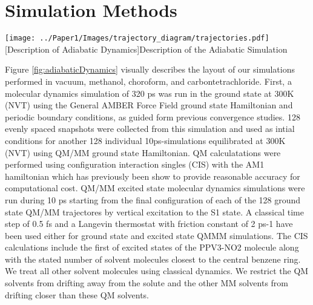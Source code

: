 \section{Simulation Methods}

\noindent
\begin{minipage}[c]{\textwidth}
  \centering
  \texttt{[image: ../Paper1/Images/trajectory\_diagram/trajectories.pdf]}
  [Description of Adiabatic Dynamics]{Description of the Adiabatic Simulation}
  \label{fig:adiabaticDynamics}
\end{minipage}\bigskip

Figure \ref{fig:adiabaticDynamics} visually describes the layout of our simulations performed in vacuum, methanol, choroform, and carbontetrachloride.
First, a molecular dynamics simulation of 320 ps was run in the ground state at 300K (NVT) using the General AMBER Force Field ground state Hamiltonian and periodic boundary conditions, as guided form previous convergence studies. \cite{silva2010benchmark}
128 evenly spaced snapshots were collected from this simulation and used as intial conditions for another 128 individual 10ps-simulations equilibrated at 300K (NVT) using QM/MM ground state Hamiltonian.
QM calculatations were performed using configuration interaction singles (CIS) with the AM1 hamiltonian which has previously been show to provide reasonable accuracy for computational cost. \cite{silva2010benchmark}
QM/MM excited state molecular dynamics simulations were run during 10 ps starting from the final configuration of each of the 128 ground state QM/MM trajectores by vertical excitation to the S1 state. \cite{nelson2012nonadiabatic}
A classical time step of 0.5 fs and a Langevin thermostat with friction constant of 2 ps-1 have been used either for ground state and excited state QMMM simulations. \cite{nelson2012nonadiabatic}
The CIS calculations include the first of excited states of the PPV3-NO2 molecule along with the stated number of solvent molecules closest to the central benzene ring.
We treat all other solvent molecules using classical dynamics.
We restrict the QM solvents from drifting away from the solute and the other MM solvents from drifting closer than these QM solvents.

\noindent
	  \begin{multiFigure} 
	    \label{fig:PPV3NO2}
	  \end{multiFigure}
\bigskip

